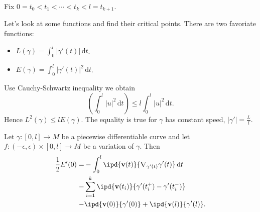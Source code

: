  Fix $0=t_0<t_1<\cdots <t_k<l=t_{k+1}$. 

 Let's look at some functions and find their critical points. There are two favoriate functions:
 \begin{itemize}
   \item $L(\gamma)=\int_0^{l}|\gamma'(t)|\,\mathrm{d}t$.
   \item $E(\gamma)=\int_0^{l}|\gamma'(t)|^2\,\mathrm{d}t$.
 \end{itemize}
 Use Cauchy-Schwartz inequality we obtain
 \[
   \left( \int_0^{l}|u|^2\,\mathrm{d}t \right) \le l \int_0^{l}|u|^2\,\mathrm{d}t.
 \] 
 Hence $L^2(\gamma)\le l E(\gamma)$. The equality is true for $\gamma$ has constant speed, $|\gamma'|= \frac{L}{l}$.

 \begin{proposition}
   Let $\gamma:[0,l]\to M$ be a piecewise differentiable curve and let  $f:(-\epsilon ,\epsilon )\times [0,l]\to M$ be a variation of $\gamma$. Then 
   \begin{align}
     \frac{1}{2}E'(0)=& -\int_0^{l}\ipd{\mathbf{v}(t)}{\nabla _{\gamma'(t)}\gamma'(t)}\,\mathrm{d}t\notag\\
     -& \sum_{i=1}^{k} \ipd{\mathbf{v}(t_i)}{\gamma'(t_i^+)-\gamma'(t_i^-)}\notag\\
     -& \ipd{\mathbf{v}(0)}{\gamma'(0)}+\ipd{\mathbf{v}(l)}{\gamma'(l)}\label{var-1}
   .\end{align}
\end{proposition}

